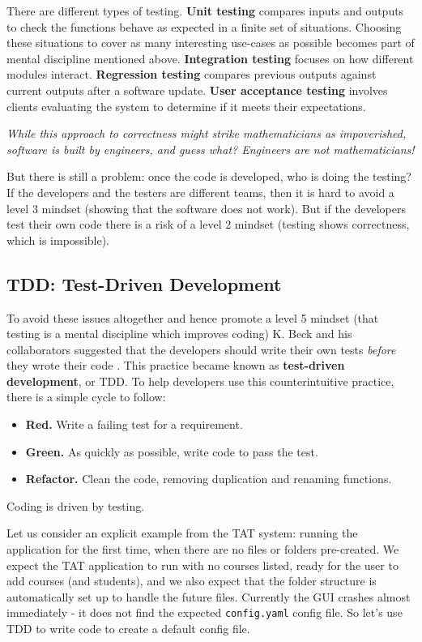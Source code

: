 \documentclass[10pt]{article}
\begin{document}
There are different types of testing. \textbf{Unit testing} compares inputs and outputs to check the functions behave as expected in a finite set of situations. Choosing these situations to cover as many interesting use-cases as possible becomes part of mental discipline mentioned above. \textbf{Integration testing} focuses on how different modules interact. \textbf{Regression testing} compares previous outputs against current outputs after a software update. \textbf{User acceptance testing} involves clients evaluating the system to determine if it meets their expectations.

\begin{center}
\emph{While this approach to correctness might strike mathematicians as impoverished, software is built by engineers, and guess what? Engineers are not mathematicians!} \cite[p. 98]{Amman16}
\end{center}

But there is still a problem: once the code is developed, who is doing the testing? If the developers and the testers are different teams, then it is hard to avoid a level 3 mindset (showing that the software does not work). But if the developers test their own code there is a risk of a level 2 mindset (testing shows correctness, which is impossible).

\subsection{TDD: Test-Driven Development}
To avoid these issues altogether and hence promote a level 5 mindset (that testing is a mental discipline which improves coding) K. Beck and his collaborators suggested that the developers should write their own tests \emph{before} they wrote their code \cite{Beck03}. This practice became known as \textbf{test-driven development}, or TDD. To help developers use this counterintuitive practice, there is a simple cycle to follow:
\begin{itemize}
\item \textbf{Red.} Write a failing test for a requirement.
\item \textbf{Green.} As quickly as possible, write code to pass the test.
\item \textbf{Refactor.} Clean the code, removing duplication and renaming functions.
\end{itemize}
Coding is driven by testing.

Let us consider an explicit example from the TAT system: running the application for the first time, when there are no files or folders pre-created. We expect the TAT application to run with no courses listed, ready for the user to add courses (and students), and we also expect that the folder structure is automatically set up to handle the future files. Currently the GUI crashes almost immediately - it does not find the expected \texttt{config.yaml} config file. So let's use TDD to write code to create a default config file. 
\end{document}

